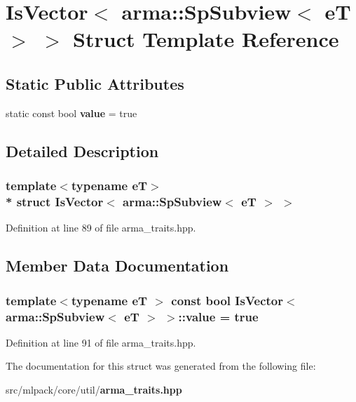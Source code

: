 \section{Is\+Vector$<$ arma\+:\+:Sp\+Subview$<$ eT $>$ $>$ Struct Template Reference}
\label{structIsVector_3_01arma_1_1SpSubview_3_01eT_01_4_01_4}
\subsection*{Static Public Attributes}
\begin{DoxyCompactItemize}
\item 
static const bool {\bf value} = true
\end{DoxyCompactItemize}


\subsection{Detailed Description}
\subsubsection*{template$<$typename eT$>$\\*
struct Is\+Vector$<$ arma\+::\+Sp\+Subview$<$ e\+T $>$ $>$}



Definition at line 89 of file arma\+\_\+traits.\+hpp.



\subsection{Member Data Documentation}
\subsubsection[{value}]{\setlength{\rightskip}{0pt plus 5cm}template$<$typename eT $>$ const bool {\bf Is\+Vector}$<$ arma\+::\+Sp\+Subview$<$ eT $>$ $>$\+::value = true\hspace{0.3cm}{\ttfamily [static]}}\label{structIsVector_3_01arma_1_1SpSubview_3_01eT_01_4_01_4_af4e0f76aa9ad00c0aa492cb8e9725b59}


Definition at line 91 of file arma\+\_\+traits.\+hpp.



The documentation for this struct was generated from the following file\+:\begin{DoxyCompactItemize}
\item 
src/mlpack/core/util/{\bf arma\+\_\+traits.\+hpp}\end{DoxyCompactItemize}
